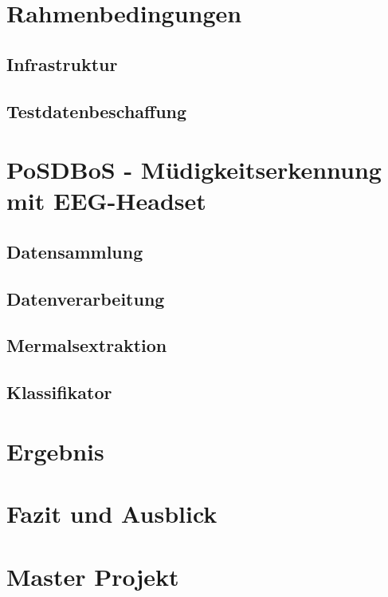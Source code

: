\chapter{Rahmenbedingungen}


\section{Infrastruktur}


\section{Testdatenbeschaffung}



\chapter{PoSDBoS - Müdigkeitserkennung mit EEG-Headset}


\section{Datensammlung}


\section{Datenverarbeitung}


\section{Mermalsextraktion}


\section{Klassifikator}



\chapter{Ergebnis}


\chapter{Fazit und Ausblick}


\chapter{Master Projekt}


\cleardoublepage 


\cleardoublepage
%

